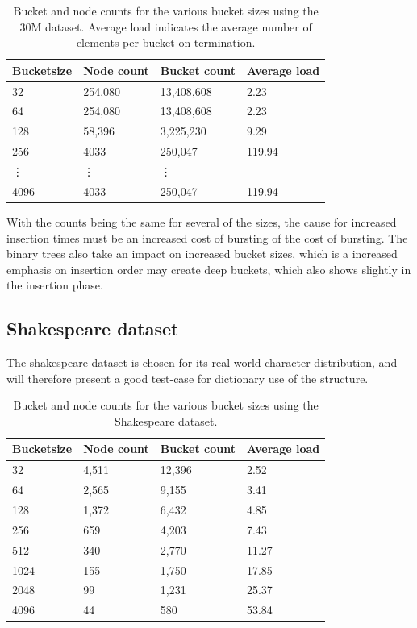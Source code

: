 \begin{table}[h]
    \centering
    \begin{tabular}[here]{ l l l l }
        \hline
        Bucketsize& Node count  & Bucket count & Average load  \\\hline
        32        &  254,080    & 13,408,608   & 2.23\\
        64        &  254,080    & 13,408,608   & 2.23\\
        128       &  58,396     & 3,225,230    & 9.29\\
        256       &  4033       & 250,047      & 119.94\\
        \vdots    &  \vdots     & \vdots       &\\
        4096      &  4033       & 250,047      & 119.94\\\hline 
    \end{tabular}
    \caption{Bucket and node counts for the various bucket sizes using the
        30M dataset. Average load indicates the average number of elements
        per bucket on termination.}
    \label{tab:bncounts_30M}
\end{table}

With the counts being the same for several of the sizes, the cause for
increased insertion times must be an increased cost of bursting of the cost of
bursting. The binary trees also take an impact on increased bucket sizes, which
is a increased emphasis on insertion order may create deep buckets, which also
shows slightly in the insertion phase.


\subsection{Shakespeare dataset}
The shakespeare dataset is chosen for its real-world character distribution, and will
therefore present a good test-case for dictionary use of the structure.

\begin{table}[h]
    \centering
    \begin{tabular}[here]{ l l l l }
        \hline
        Bucketsize&  Node count & Bucket count& Average load  \\\hline
        32        &  4,511      & 12,396      & 2.52 \\
        64        &  2,565      & 9,155       & 3.41 \\
        128       &  1,372      & 6,432       & 4.85 \\
        256       &  659        & 4,203       & 7.43 \\
        512       &  340        & 2,770       & 11.27\\
        1024      &  155        & 1,750       & 17.85\\ 
        2048      &  99         & 1,231       & 25.37\\ 
        4096      &  44         & 580         & 53.84\\\hline 
    \end{tabular}
    \caption{Bucket and node counts for the various bucket sizes using the Shakespeare
        dataset.}
    \label{tab:bncounts_shakespeare}
\end{table}

